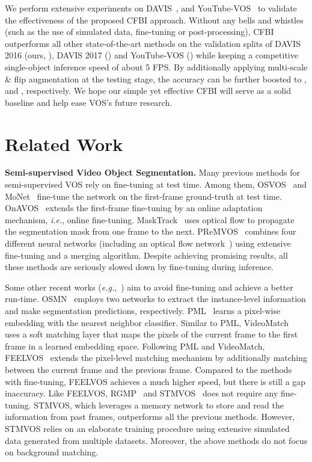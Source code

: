 \documentclass[runningheads]{llncs}
\def\eg{\emph{e.g.}}
\def\ie{\emph{i.e.}}
\begin{document}
We perform extensive experiments on DAVIS~\cite{davis2016,davis2017}, and YouTube-VOS~\cite{youtubevos} to validate the effectiveness of the proposed CFBI approach. Without any bells and whistles (such as the use of simulated data, fine-tuning or post-processing), CFBI outperforms all other state-of-the-art methods on the validation splits of DAVIS 2016 (ours,  ), DAVIS 2017 () and YouTube-VOS () while keeping a competitive single-object inference speed of about 5 FPS. By additionally applying multi-scale \& flip augmentation at the testing stage, the accuracy can be further boosted to ,  and , respectively. 
We hope our simple yet effective CFBI will serve as a solid baseline and help ease VOS's future research.


\section{Related Work}

\noindent\textbf{Semi-supervised Video Object Segmentation.}
Many previous methods for semi-supervised VOS rely on fine-tuning at test time. Among them, OSVOS~\cite{osvos} and MoNet~\cite{xiao2018monet} fine-tune the network on the first-frame ground-truth at test time. OnAVOS~\cite{onavos} extends the first-frame fine-tuning by an online adaptation mechanism, \ie, online fine-tuning. MaskTrack~\cite{masktrack} uses optical flow to propagate the segmentation mask from one frame to the next. PReMVOS~\cite{premvos} combines four different neural networks (including an optical flow network~\cite{flownet}) using extensive fine-tuning and a merging algorithm. Despite achieving promising results, all these methods are seriously slowed down by fine-tuning during inference.

Some other recent works (\eg,~\cite{osmn,favos}) aim to avoid fine-tuning and achieve a better run-time. OSMN~\cite{osmn} employs two networks to extract the instance-level information and make segmentation predictions, respectively.  PML~\cite{pml} learns a pixel-wise embedding with the nearest neighbor classifier. Similar to PML, VideoMatch~\cite{videomatch} uses a soft matching layer that maps the pixels of the current frame to the first frame in a learned embedding space. Following PML and VideoMatch, FEELVOS~\cite{feelvos} extends the pixel-level matching mechanism by additionally matching between the current frame and the previous frame. Compared to the methods with fine-tuning, FEELVOS achieves a much higher speed, but there is still a gap inaccuracy. Like FEELVOS, RGMP~\cite{rgmp} and STMVOS~\cite{spacetime} does not require any fine-tuning. STMVOS, which leverages a memory network to store and read the information from past frames, outperforms all the previous methods. However, STMVOS relies on an elaborate training procedure using extensive simulated data generated from multiple datasets. Moreover, the above methods do not focus on background matching.
\end{document}
